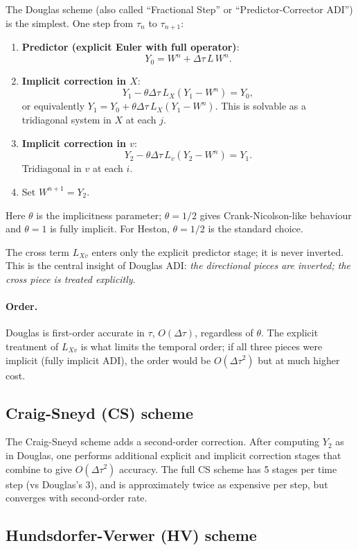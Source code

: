 \documentclass[11pt]{article}
\theoremstyle{plain}
\theoremstyle{definition}
\theoremstyle{remark}
\begin{document}
The Douglas scheme (also called ``Fractional Step'' or ``Predictor-Corrector ADI'') is the simplest. One step from $\tau_n$ to $\tau_{n+1}$:
\begin{enumerate}[topsep=2pt]
    \item \textbf{Predictor (explicit Euler with full operator)}:
    \[
        Y_0 = W^n + \Delta\tau\, L\, W^n.
    \]
    \item \textbf{Implicit correction in $X$}:
    \[
        Y_1 - \theta \Delta\tau\, L_X (Y_1 - W^n) = Y_0,
    \]
    or equivalently $Y_1 = Y_0 + \theta \Delta\tau\, L_X (Y_1 - W^n)$. This is solvable as a tridiagonal system in $X$ at each $j$.
    \item \textbf{Implicit correction in $v$}:
    \[
        Y_2 - \theta \Delta\tau\, L_v (Y_2 - W^n) = Y_1.
    \]
    Tridiagonal in $v$ at each $i$.
    \item Set $W^{n+1} = Y_2$.
\end{enumerate}
Here $\theta$ is the implicitness parameter; $\theta = 1/2$ gives Crank-Nicolson-like behaviour and $\theta = 1$ is fully implicit. For Heston, $\theta = 1/2$ is the standard choice.

The cross term $L_{Xv}$ enters only the explicit predictor stage; it is never inverted. This is the central insight of Douglas ADI: \emph{the directional pieces are inverted; the cross piece is treated explicitly}.

\paragraph{Order.} Douglas is first-order accurate in $\tau$, $O(\Delta\tau)$, regardless of $\theta$. The explicit treatment of $L_{Xv}$ is what limits the temporal order; if all three pieces were implicit (fully implicit ADI), the order would be $O(\Delta\tau^2)$ but at much higher cost.

\subsection{Craig-Sneyd (CS) scheme}

The Craig-Sneyd scheme adds a second-order correction. After computing $Y_2$ as in Douglas, one performs additional explicit and implicit correction stages that combine to give $O(\Delta\tau^2)$ accuracy. The full CS scheme has 5 stages per time step (vs Douglas's 3), and is approximately twice as expensive per step, but converges with second-order rate.

\subsection{Hundsdorfer-Verwer (HV) scheme}
\end{document}
